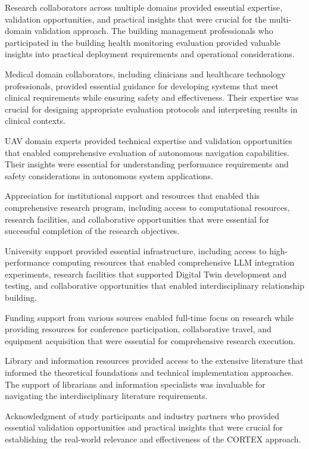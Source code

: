 Research collaborators across multiple domains provided essential expertise, validation opportunities, and practical insights that were crucial for the multi-domain validation approach. The building management professionals who participated in the building health monitoring evaluation provided valuable insights into practical deployment requirements and operational considerations.

Medical domain collaborators, including clinicians and healthcare technology professionals, provided essential guidance for developing systems that meet clinical requirements while ensuring safety and effectiveness. Their expertise was crucial for designing appropriate evaluation protocols and interpreting results in clinical contexts.

UAV domain experts provided technical expertise and validation opportunities that enabled comprehensive evaluation of autonomous navigation capabilities. Their insights were essential for understanding performance requirements and safety considerations in autonomous system applications.

Appreciation for institutional support and resources that enabled this comprehensive research program, including access to computational resources, research facilities, and collaborative opportunities that were essential for successful completion of the research objectives.

University support provided essential infrastructure, including access to high-performance computing resources that enabled comprehensive LLM integration experiments, research facilities that supported Digital Twin development and testing, and collaborative opportunities that enabled interdisciplinary relationship building.

Funding support from various sources enabled full-time focus on research while providing resources for conference participation, collaborative travel, and equipment acquisition that were essential for comprehensive research execution.

Library and information resources provided access to the extensive literature that informed the theoretical foundations and technical implementation approaches. The support of librarians and information specialists was invaluable for navigating the interdisciplinary literature requirements.

Acknowledgment of study participants and industry partners who provided essential validation opportunities and practical insights that were crucial for establishing the real-world relevance and effectiveness of the CORTEX approach.

